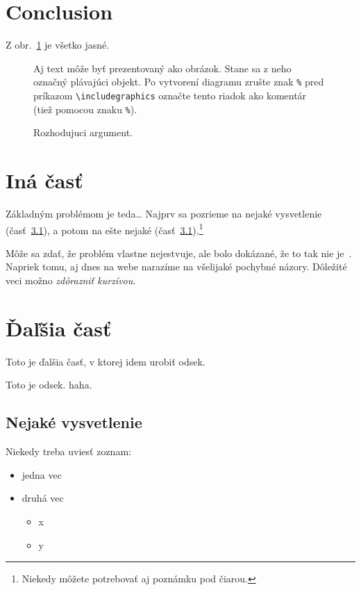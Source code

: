 \documentclass[10pt,twoside,english,a4paper]{article}
\begin{document}
\section{Conclusion}\label{conclusion}

Z obr.~\ref{f:rozhod} je všetko jasné. 

\begin{figure}[tbh]
\centering
Aj text môže byť prezentovaný ako obrázok. Stane sa z neho označný plávajúci objekt. Po vytvorení diagramu zrušte znak \texttt{\%} pred príkazom \verb|\includegraphics| označte tento riadok ako komentár (tiež pomocou znaku \texttt{\%}).
\caption{Rozhodujuci argument.}
\label{f:rozhod}
\end{figure}



\section{Iná časť} \label{ina}

Základným problémom je teda\ldots{} Najprv sa pozrieme na nejaké vysvetlenie (časť~\ref{ina:nejake}), a potom na ešte nejaké (časť~\ref{ina:nejake}).\footnote{Niekedy môžete potrebovať aj poznámku pod čiarou.}

Môže sa zdať, že problém vlastne nejestvuje\cite{Coplien:MPD}, ale bolo dokázané, že to tak nie je~\cite{Czarnecki:Staged, Czarnecki:Progress}. Napriek tomu, aj dnes na webe narazíme na všelijaké pochybné názory\cite{PLP-Framework}. Dôležité veci možno \emph{zdôrazniť kurzívou}.

\section{Ďaľšia časť}
Toto je ďalšia časť, v ktorej idem urobiť odsek.

Toto je odsek. haha.

\subsection{Nejaké vysvetlenie} \label{ina:nejake}

Niekedy treba uviesť zoznam:

\begin{itemize}
\item jedna vec
\item druhá vec
	\begin{itemize}
	\item x
	\item y
	\end{itemize}
\end{itemize}
\end{document}
